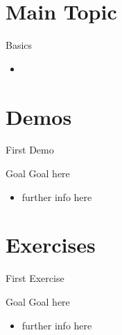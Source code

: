 \documentclass[presentation]{beamer}\mode<presentation>{\usetheme{AMSBolognaFC}}
\begin{document}
\section{Main Topic}

\begin{frame}{Basics}
    \begin{itemize}
        \item
    \end{itemize}
\end{frame}

\section{Demos}

\begin{frame}{First Demo}
    \begin{block}{Goal}
        Goal here
    \end{block}
    \begin{itemize}
        \item further info here
    \end{itemize}
\end{frame}

\section{Exercises}

\begin{frame}{First Exercise}
    \begin{block}{Goal}
        Goal here
    \end{block}
    \begin{itemize}
        \item further info here
    \end{itemize}
\end{frame}

\section*{}
\end{document}

